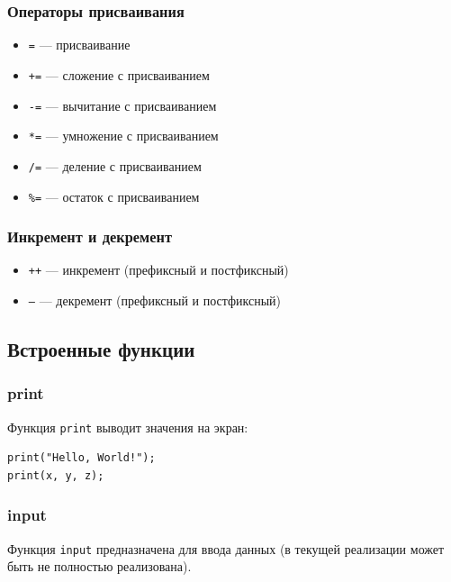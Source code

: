 \documentclass[12pt,a4paper]{article}
\begin{document}
\subsubsection{Операторы присваивания}

\begin{itemize}
    \item \texttt{=} --- присваивание
    \item \texttt{+=} --- сложение с присваиванием
    \item \texttt{-=} --- вычитание с присваиванием
    \item \texttt{*=} --- умножение с присваиванием
    \item \texttt{/=} --- деление с присваиванием
    \item \texttt{\%=} --- остаток с присваиванием
\end{itemize}

\subsubsection{Инкремент и декремент}

\begin{itemize}
    \item \texttt{++} --- инкремент (префиксный и постфиксный)
    \item \texttt{--} --- декремент (префиксный и постфиксный)
\end{itemize}

\subsection{Встроенные функции}

\subsubsection{print}

Функция \texttt{print} выводит значения на экран:

\begin{lstlisting}
print("Hello, World!");
print(x, y, z);
\end{lstlisting}

\subsubsection{input}

Функция \texttt{input} предназначена для ввода данных (в текущей реализации может быть не полностью реализована).
\end{document}
